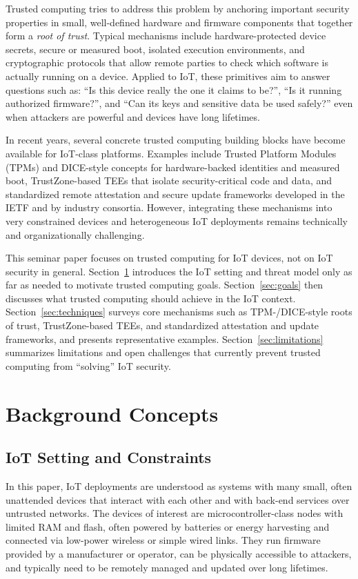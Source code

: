 \documentclass[conference,11pt,a4paper]{IEEEtran}
\begin{document}
Trusted computing tries to address this problem by anchoring important security properties in small, well-defined hardware and firmware components that together form a \emph{root of trust}. Typical mechanisms include hardware-protected device secrets, secure or measured boot, isolated execution environments, and cryptographic protocols that allow remote parties to check which software is actually running on a device. Applied to IoT, these primitives aim to answer questions such as: ``Is this device really the one it claims to be?'', ``Is it running authorized firmware?'', and ``Can its keys and sensitive data be used safely?'' even when attackers are powerful and devices have long lifetimes.

In recent years, several concrete trusted computing building blocks have become available for IoT-class platforms. Examples include Trusted Platform Modules (TPMs) and DICE-style concepts for hardware-backed identities and measured boot, TrustZone-based TEEs that isolate security-critical code and data, and standardized remote attestation and secure update frameworks developed in the IETF and by industry consortia.\cite{tcg_iot,tee_trustcom,rats_arch,suit_arch} However, integrating these mechanisms into very constrained devices and heterogeneous IoT deployments remains technically and organizationally challenging.

This seminar paper focuses on trusted computing for IoT devices, not on IoT security in general. Section~\ref{sec:background} introduces the IoT setting and threat model only as far as needed to motivate trusted computing goals. Section~\ref{sec:goals} then discusses what trusted computing should achieve in the IoT context. Section~\ref{sec:techniques} surveys core mechanisms such as TPM-/DICE-style roots of trust, TrustZone-based TEEs, and standardized attestation and update frameworks, and presents representative examples. Section~\ref{sec:limitations} summarizes limitations and open challenges that currently prevent trusted computing from ``solving'' IoT security.

\section{Background Concepts}
\label{sec:background}

\subsection{IoT Setting and Constraints}
In this paper, IoT deployments are understood as systems with many small, often unattended devices that interact with each other and with back-end services over untrusted networks. The devices of interest are microcontroller-class nodes with limited RAM and flash, often powered by batteries or energy harvesting and connected via low-power wireless or simple wired links. They run firmware provided by a manufacturer or operator, can be physically accessible to attackers, and typically need to be remotely managed and updated over long lifetimes.
\end{document}
